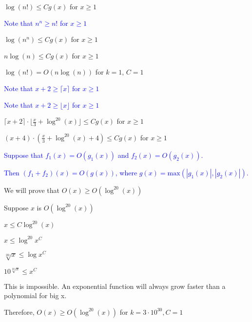 \documentclass{exam}
\begin{document}
\begin{questions}
\begin{subparts}
\begin{center}

\(\log(n!) \leq Cg(x)\) for \(x \geq 1\)
\vspace{5px}

\textcolor{blue}{Note that \(n^n \geq n!\) for \(x \geq 1\)}
\vspace{5px}

\(\log(n^n) \leq Cg(x)\) for \(x \geq 1\)

\(n\log(n) \leq Cg(x)\) for \(x \geq 1\)

\(\log(n!) = O(n\log(n))\) for \(k = 1\), \(C = 1\)

\end{center}

\newpage


\begin{center}
\textcolor{blue}{Note that \( x+2 \geq \lceil x \rceil\) for \(x \geq 1\)}

\textcolor{blue}{Note that \( x+2 \geq \lfloor x \rfloor\) for \(x \geq 1\)}
\vspace{5px}

\( \lceil x + 2 \rceil \cdot \lfloor \frac{x}{3} + \log^{20}(x) \rfloor \leq Cg(x)\) for \(x \geq 1\)

\( (x + 4) \cdot (\frac{x}{3} + \log^{20}(x) + 4) \leq Cg(x)\) for \(x \geq 1\)

\vspace{5px}
\textcolor{blue}{Suppose that \(f_1(x) = O(g_1(x))\) and \(f_2(x) = O(g_2(x))\).}

\textcolor{blue}{Then \((f_1 + f_2)(x) = O(g(x))\), where \(g(x) = \text{max}(|g_1(x)|, |g_2(x)|)\).}
\vspace{5px}

We will prove that \(O(x) \geq O(\log^{20}(x))\)

Suppose \(x\) is \(O(\log^{20}(x))\)

\(x \leq C\log^{20}(x)\)

\(x \leq \log^{20}{x^C}\)

\(\sqrt[20]{x} \leq \log{x^C}\)

\(10^{\sqrt[20]{x}} \leq x^C\)



This is impossible. An exponential function will always grow faster than a polynomial for big x.

Therefore, \(O(x) \geq O(\log^{20}(x))\) for \(k = 3 \cdot 10^{30}, C = 1\)


\end{center}
\end{subparts}
\end{questions}
\end{document}
